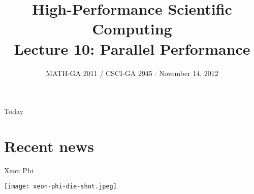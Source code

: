 \documentclass[english,compress]{beamer}
\begin{document}

\title{High-Performance Scientific Computing\\Lecture 10: Parallel Performance}

\date{MATH-GA 2011 / CSCI-GA 2945 $\cdot$ November 14, 2012}

\frame{\titlepage}

\begin{frame}{Today}
  \tableofcontents[hideallsubsections]
\end{frame}
\begin{comment}
\begin{frame}{Bits and pieces}
  \begin{itemize}
    \item Don't have a project? Let's fix that \emph{very soon}
    \item HW5: soon
    \item HW6: due today
    \item Dec 5: Last day of regular class
    \item Dec 12: Legislative Day
    \item Dec 17/18/\textbf{19}: Project presentations
    \item Don't have grade reports for HW1\dots4? Talk to me
  \end{itemize}
\end{frame}
\end{comment}
\section[Phi]{Recent news}
\begin{frame}{Xeon Phi}
  \begin{center}
    \texttt{[image: xeon-phi-die-shot.jpeg]}
  \end{center}
\end{frame}
\end{document}
